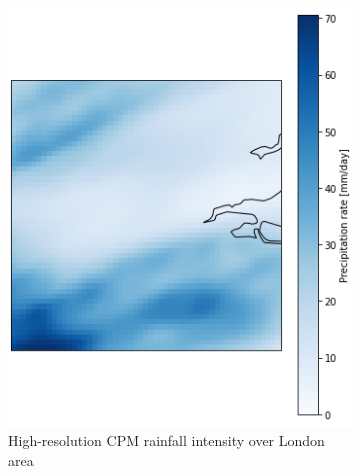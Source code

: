 \begin{figure}[hp]
    \begin{subfigure}{0.45\textwidth}
        \includegraphics[width=1.0\linewidth]{../figures/modelling/cpm-london-pr-1981-01-26.png}
        \caption{High-resolution CPM rainfall intensity over London area}
        \label{fig:modelling:cpm-london-snapshot}
    \end{subfigure}
    \hspace{1em}
    \begin{subfigure}{0.45\textwidth}

\end{subfigure}
\end{figure}

